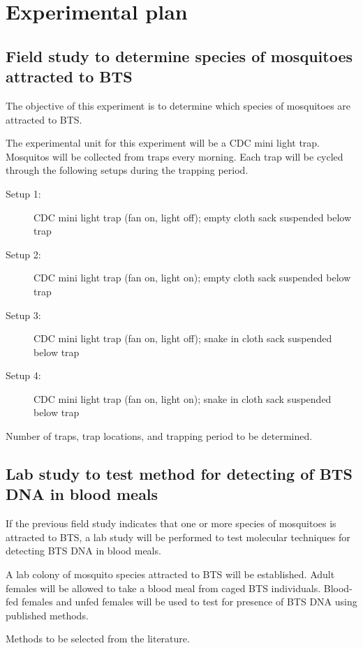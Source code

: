 \documentclass[12pt,letterpaper,english,bibliography=totocnumbered,abstract=on]{scrartcl}
\begin{document}
\section{Experimental plan} 

\subsection{Field study to determine species of mosquitoes attracted to BTS}

The objective of this experiment is to determine which species of mosquitoes are attracted to BTS.

The experimental unit for this experiment will be a CDC mini light trap. Mosquitos will be collected from  traps every morning. Each trap will be cycled through the following setups during the trapping period. 

\begin{description}
\item[Setup 1:] CDC mini light trap (fan on, light off); empty cloth sack suspended below trap
\item[Setup 2:] CDC mini light trap (fan on, light on);  empty cloth sack suspended below trap
\item[Setup 3:] CDC mini light trap (fan on, light off); snake in cloth sack suspended below trap
\item[Setup 4:] CDC mini light trap (fan on, light on);  snake in cloth sack suspended below trap
\end{description}

Number of traps, trap locations, and trapping period to be determined.

\subsection{Lab study to test method for detecting of BTS DNA in blood meals}

If the previous field study indicates that one or more species of mosquitoes is attracted to BTS, a lab study will be performed to test molecular techniques for detecting BTS DNA in blood meals. 

A lab colony of mosquito species attracted to BTS will be established. Adult females will be allowed to take a blood meal from caged BTS individuals. Blood-fed females and unfed females will be used to test for presence of BTS DNA using published methods.

Methods to be selected from the literature.
\end{document}
